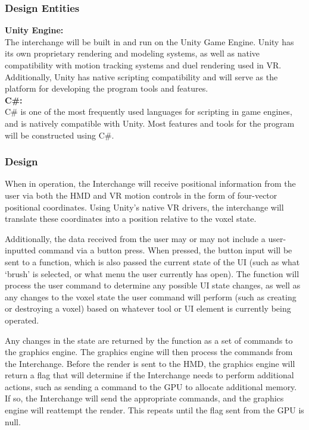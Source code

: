 \documentclass[onecolumn, draftclsnofoot,10pt, compsoc]{IEEEtran}
\begin{document}
\subsubsection{Design Entities}
\textbf{Unity Engine:}\\
The interchange will be built in and run on the Unity Game Engine. Unity has its own proprietary rendering and modeling systems, as well as native compatibility with motion tracking systems and duel rendering used in VR. Additionally, Unity has native scripting compatibility and will serve as the platform for developing the program tools and features.\cite{unity}\\
\textbf{C\#:}\\
C\# is one of the most frequently used languages for scripting in game engines, and is natively compatible with Unity. Most features and tools for the program will be constructed using C\#. 

\subsubsection{Design}
When in operation, the Interchange will receive positional information from the user via both the HMD and VR motion controls in the form of four-vector positional coordinates. Using Unity’s native VR drivers, the interchange will translate these coordinates into a position relative to the voxel state.

Additionally, the data received from the user may or may not include a user-inputted command via a button press. When pressed, the button input will be sent to a function, which is also passed the current state of the UI (such as what ‘brush’ is selected, or what menu the user currently has open). The function will process the user command to determine any possible UI state changes, as well as any changes to the voxel state the user command will perform (such as creating or destroying a voxel) based on whatever tool or UI element is currently being operated. 

Any changes in the state are returned by the function as a set of commands to the graphics engine. The graphics engine will then process the commands from the Interchange. Before the render is sent to the HMD, the graphics engine will return a flag that will determine if the Interchange needs to perform additional actions, such as sending a command to the GPU to allocate additional memory. If so, the Interchange will send the appropriate commands, and the graphics engine will reattempt the render. This repeats until the flag sent from the GPU is null. 
\end{document}

